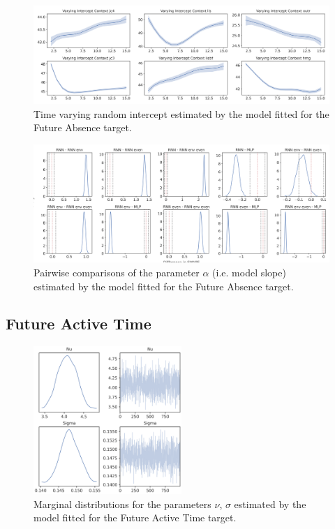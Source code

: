 \begin{figure}[ht]
\centering
\includegraphics[width=\textwidth]{images/appendix_C/Future Absence_interc_3.png}
\caption[\textbf{Future absence time-varying random intercept}]{Time varying random intercept estimated by the model fitted for the Future Absence target.}
\label{interc_abs_3}
\end{figure} \FloatBarrier

\begin{figure}[ht]
\centering
\includegraphics[width=\textwidth]{images/appendix_C/Future_Absence_comp_3.png}
\caption[\textbf{Future absence pairwise comparisons of model fixed effect}]{Pairwise comparisons of the parameter $\alpha$ (i.e. model slope) estimated by the model fitted for the Future Absence target.}
\label{comp_abs_3}
\end{figure} \FloatBarrier

\subsection{Future Active Time}
\label{future_abs_bayes_3}

\begin{figure}[ht]
\centering
\includegraphics[width=0.5\textwidth]{images/appendix_C/Future Active Time_marginals_3.png}
\caption[\textbf{Future active time marginal distributions}]{Marginal distributions for the parameters $\nu$, $\sigma$ estimated by the model fitted for the Future Active Time target.}
\label{marginals_act_3}
\end{figure} \FloatBarrier

